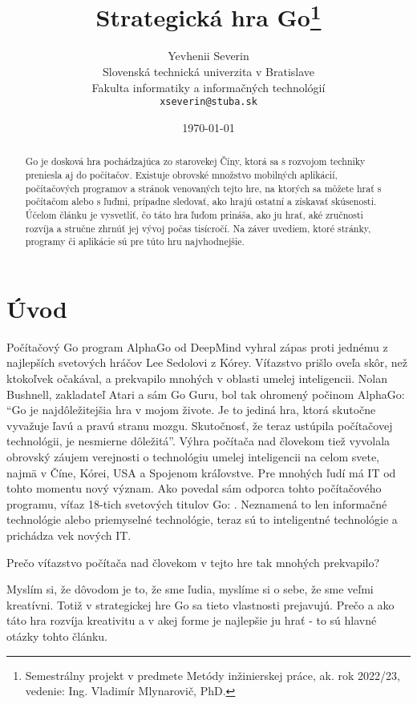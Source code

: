 \documentclass[10pt,twoside,slovak,a4paper]{article}
\title{Strategická hra Go\thanks{Semestrálny projekt v predmete Metódy inžinierskej práce, ak. rok 2022/23, vedenie: Ing. Vladimír Mlynarovič, PhD.}}
\author{Yevhenii Severin\\[2pt]
	{\small Slovenská technická univerzita v Bratislave}\\
	{\small Fakulta informatiky a informačných technológií}\\
	{\small \texttt{xseverin@stuba.sk}}
	}
\date{\small \today}
\begin{document}
\maketitle

\begin{abstract}
Go je dosková hra pochádzajúca zo starovekej Číny, ktorá sa s rozvojom techniky preniesla aj do počítačov. Existuje obrovské množstvo mobilných aplikácií, počítačových programov a stránok venovaných tejto hre, na ktorých sa môžete hrať s počítačom alebo s ľuďmi, prípadne sledovať, ako hrajú ostatní a získavať skúsenosti. Účelom článku je vysvetliť, čo táto hra ľuďom prináša, ako ju hrať, aké zručnosti rozvíja a stručne zhrnúť jej vývoj počas tisícročí. Na záver uvediem, ktoré stránky, programy či aplikácie sú pre túto hru najvhodnejšie.
\end{abstract}



\section{Úvod}
Počítačový Go program AlphaGo od DeepMind vyhral zápas proti jednému z najlepších svetových hráčov Lee Sedolovi z Kórey. Víťazstvo prišlo oveľa skôr, než ktokoľvek očakával, a prekvapilo mnohých v oblasti umelej inteligencii. Nolan Bushnell, zakladateľ Atari a sám Go Guru, bol tak ohromený počinom AlphaGo: \enquote{Go je najdôležitejšia hra v mojom živote. Je to jediná hra, ktorá skutočne vyvažuje ľavú a pravú stranu mozgu.  Skutočnosť, že teraz ustúpila počítačovej technológii, je nesmierne dôležitá}. Výhra počítača nad človekom tiež vyvolala obrovský záujem verejnosti o technológiu umelej inteligencii na celom svete, najmä v Číne, Kórei, USA a Spojenom kráľovstve. Pre mnohých ľudí má IT od tohto momentu nový význam. Ako povedal sám odporca tohto počítačového programu, víťaz 18-tich svetových titulov Go: . Neznamená to len informačné technológie alebo priemyselné technológie, teraz sú to inteligentné technológie a prichádza vek nových IT.\cite{webAlphaGo}\cite{7471613}
  
Prečo víťazstvo počítača nad človekom v tejto hre tak mnohých prekvapilo?

Myslím si, že dôvodom je to, že sme ľudia, myslíme si o sebe, že sme veľmi kreatívni. Totiž v strategickej hre Go sa tieto vlastnosti prejavujú. Prečo a ako táto hra rozvíja kreativitu a v akej forme je najlepšie ju hrať - to sú hlavné otázky tohto článku.
\end{document}
